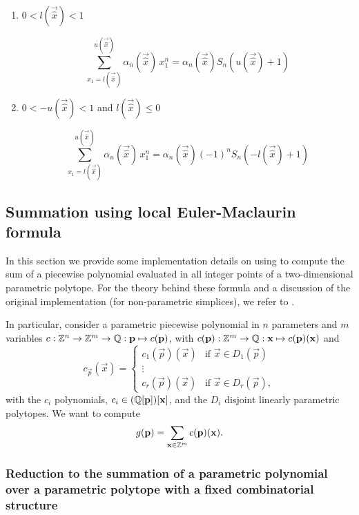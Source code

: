 \begin{enumerate}
\setcounter{enumi}{\value{saveenumi}}
\item $0 < l(\vec {\hat x}) < 1$

$$
\sum_{x_1 = l(\vec {\hat x})}^{u(\vec{\hat x})} \alpha_n(\vec{\hat x}) \, x_1^n
=
\alpha_n(\vec{\hat x})
S_n(u(\vec{\hat x})+1)
$$

\item $0 < -u(\vec {\hat x}) < 1$ and $l(\vec {\hat x}) \le 0$

$$
\sum_{x_1 = l(\vec {\hat x})}^{u(\vec{\hat x})} \alpha_n(\vec{\hat x}) \, x_1^n
=
\alpha_n(\vec{\hat x})
(-1)^n
S_n(-l(\vec{\hat x})+1)
$$

\end{enumerate}

\subsection{Summation using local Euler-Maclaurin formula}
\label{s:euler}

In this section we provide some implementation details
on using  to compute
the sum of a piecewise polynomial evaluated in all integer
points of a two-dimensional parametric polytope.
For the theory behind these formula and a discussion
of the original implementation (for non-parametric simplices),
we refer to .

In particular, consider a parametric piecewise polynomial
in $n$ parameters and $m$ variables
$c : \ZZ^n \to \ZZ^m \to \QQ : \vec p \mapsto c(\vec p)$,
with $c(\vec p) : \ZZ^m \to \QQ : \vec x \mapsto c(\vec p)(\vec x)$
and
$$
c_{\vec p}(\vec x) =
\begin{cases}
c_1(\vec p)(\vec x) & \text{if $\vec x \in D_1(\vec p)$}
\\
\vdots
\\
c_r(\vec p)(\vec x) & \text{if $\vec x \in D_r(\vec p)$}
,
\end{cases}
$$
with the $c_i$ polynomials, $c_i \in (\QQ[\vec p])[\vec x]$, and 
the $D_i$ disjoint linearly parametric polytopes.
We want to compute
$$
g(\vec p) = \sum_{\vec x \in \ZZ^m} c(\vec p)(\vec x)
.
$$

\subsubsection{Reduction to the summation of a parametric polynomial
over a parametric polytope with a fixed combinatorial structure}

